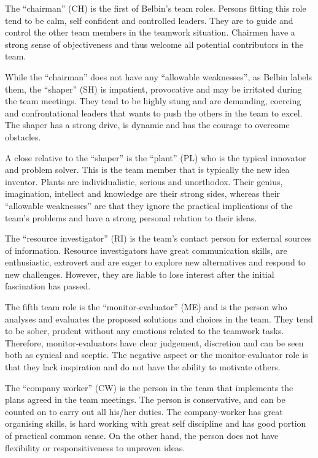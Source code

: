 \documentclass[a4paper,12pt,titlepage]{report}
\begin{document}
  The ``chairman'' (CH) is the first of Belbin's team roles. Persons fitting this role
  tend to be calm, self confident and controlled leaders. They are to guide
  and control the other team members in the teamwork situation.
  Chairmen have a strong sense of objectiveness and thus
  welcome all potential contributors in the team.

  While the ``chairman'' does not have any ``allowable weaknesses'', as Belbin labels
  them, the ``shaper'' (SH) is impatient, provocative and may be irritated during the
  team meetings. They tend to be highly stung and are demanding, coercing and
  confrontational leaders that wants to push the others in the team to excel. The
  shaper has a strong drive, is dynamic and has the courage to overcome obstacles.

  A close relative to the ``shaper'' is the ``plant'' (PL) who is the typical innovator
  and problem solver.
  This is the team member that is typically the new idea inventor. Plants are
  individualistic, serious and unorthodox. Their genius, imagination, intellect and
  knowledge are their strong sides, whereas their ``allowable weaknesses'' are that
  they ignore the practical implications of the team's problems and have a strong
  personal relation to their ideas.

  The ``resource investigator'' (RI) is the team's contact person for external sources
  of information. Resource investigators have great communication
  skills, are enthusiastic,
  extrovert and are eager to explore new alternatives and respond to new challenges.
  However, they are liable to lose interest after the initial fascination has passed.

  The fifth team role is the ``monitor-evaluator'' (ME) and is the person who analyses
  and evaluates the proposed solutions and choices in the team. They tend to be sober,
  prudent without any emotions related to the teamwork tasks.
  Therefore, monitor-evaluators
  have clear judgement, discretion and can be seen both as cynical and sceptic.
  The negative aspect or the monitor-evaluator role is that they lack
  inspiration and do not have the ability to motivate others.

  The ``company worker'' (CW) is the person in the team that implements the plans
  agreed in the team meetings. The person is conservative, and can be counted on to 
  carry out all his/her duties. The company-worker has great organising skills, is
  hard working with great self discipline and has good
  portion of practical common sense.
  On the other hand, the person does not have flexibility or responsitiveness to
  unproven ideas.
\end{document}

